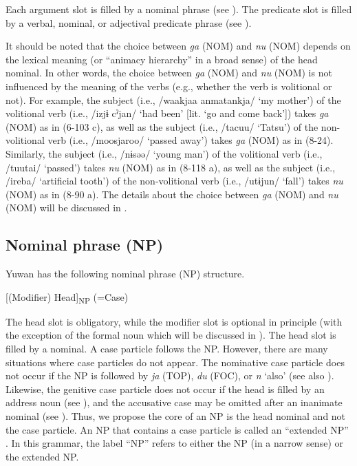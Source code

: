 Each argument slot is filled by a nominal phrase (see ). The predicate slot is filled by a verbal, nominal, or adjectival predicate phrase (see ).

It should be noted that the choice between \textit{ga} (NOM) and \textit{nu} (NOM) depends on the lexical meaning (or “animacy hierarchy” in a broad sense) of the head nominal. In other words, the choice between \textit{ga} (NOM) and \textit{nu} (NOM) is not influenced by the meaning of the verbs (e.g., whether the verb is volitional or not). For example, the subject (i.e., /waakjaa anmatankja/ ‘my mother’) of the volitional verb (i.e., /izjɨ cˀjan/ ‘had been’ [lit. ‘go and come back’]) takes \textit{ga} (NOM) as in (6-103 c), as well as the subject (i.e., /tacuu/ ‘Tatsu’) of the non-volitional verb (i.e., /moosjaroo/ ‘passed away’) takes \textit{ga} (NOM) as in (8-24). Similarly, the subject (i.e., /nɨsəə/ ‘young man’) of the volitional verb (i.e., /tuutai/ ‘passed’) takes \textit{nu} (NOM) as in (8-118 a), as well as the subject (i.e., /ireba/ ‘artificial tooth’) of the non-volitional verb (i.e., /utɨjun/ ‘fall’) takes \textit{nu} (NOM) as in (8-90 a). The details about the choice between \textit{ga} (NOM) and \textit{nu} (NOM) will be discussed in .

\subsection{Nominal phrase (NP)}\label{sec:4.1.2}

Yuwan has the following nominal phrase (NP) structure.

[(Modifier) Head]\textsubscript{NP}\textit{\textsubscript{} }(=Case)

The head slot is obligatory, while the modifier slot is optional in principle (with the exception of the formal noun which will be discussed in ). The head slot is filled by a nominal. A case particle follows the NP. However, there are many situations where case particles do not appear. The nominative case particle does not occur if the NP is followed by \textit{ja} (TOP), \textit{du} (FOC), or \textit{n} ‘also’ (see also ). Likewise, the genitive case particle does not occur if the head is filled by an address noun (see ), and the accusative case may be omitted after an inanimate nominal (see ). Thus, we propose the core of an NP is the head nominal and not the case particle. An NP that contains a case particle is called an “extended NP” \citep[167]{Shimoji2008}. In this grammar, the label “NP” refers to either the NP (in a narrow sense) or the extended NP.

